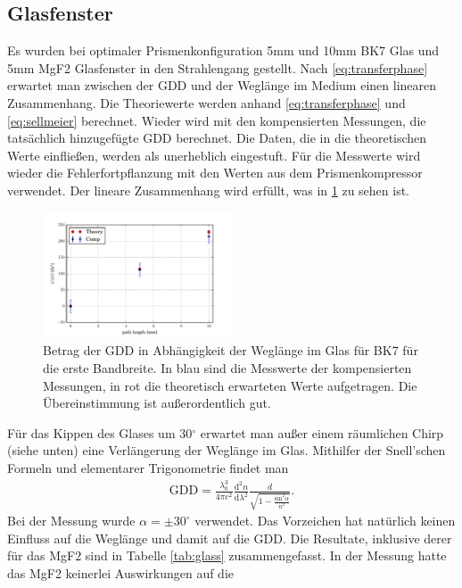 \documentclass[twoside,        %
               BCOR12mm,       %
               english,ngerman, %
               fleqn,headsepline=false,footsepline=false
              ]{Vorlage/MFPREPORT}
\renewcommand{\d}{\ensuremath{\mathrm{d}}} %
\newcommand{\diff}[3][]{\ensuremath{\frac{\d^{#1}#2}{\d#3^{#1}}}} %
\begin{document}
\subsection{Glasfenster}
Es wurden bei optimaler Prismenkonfiguration 5\;mm und 10\;mm BK7 Glas und
5\;mm MgF2 Glasfenster in den Strahlengang gestellt. Nach
\cref{eq:transferphase} erwartet man zwischen der GDD und der Weglänge im
Medium einen linearen Zusammenhang. Die Theoriewerte werden anhand
\cref{eq:transferphase} und \cref{eq:sellmeier} berechnet. Wieder wird mit den
kompensierten Messungen, die tatsächlich hinzugefügte GDD berechnet. Die Daten,
die in die theoretischen Werte einfließen, werden als unerheblich eingestuft.
Für die Messwerte wird wieder die Fehlerfortpflanzung mit den Werten aus dem
Prismenkompressor verwendet.
Der lineare Zusammenhang wird erfüllt, was in \cref{fig:gddkieran} zu sehen ist.
\begin{figure}[]
    \begin{center}
        \includegraphics[width=0.5\textwidth]{Eric/glasBK7}
    \end{center}
    \caption{Betrag der GDD in Abhängigkeit der Weglänge im Glas für BK7 für
    die erste Bandbreite. In blau sind die Messwerte der kompensierten
    Messungen, in rot die theoretisch erwarteten Werte aufgetragen. Die
    Übereinstimmung ist außerordentlich gut.}
    \label{fig:gddkieran}
\end{figure}
Für das Kippen des Glases um 30$^\circ$ erwartet man außer einem räumlichen
Chirp (siehe unten) eine Verlängerung der Weglänge im Glas. Mithilfer der
Snell'schen Formeln und elementarer Trigonometrie findet man
\begin{align}
    \text{GDD}=\frac{\lambda_0^3}{4\pi
    c^2}\diff[2]{n}{\lambda}\frac{d}{\sqrt{1-\frac{\text{sin} ^2
    \alpha}{n^2}}}.
    \label{eq:tilt}
\end{align}
Bei der Messung wurde $\alpha=\pm30^\circ$ verwendet. Das Vorzeichen hat
natürlich keinen Einfluss auf die Weglänge und damit auf die GDD.
Die Resultate, inklusive derer für das MgF2 sind in Tabelle \cref{tab:glass}
zusammengefasst. In der Messung hatte das MgF2 keinerlei Auswirkungen auf die
\end{document}
